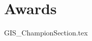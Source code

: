 \documentclass[class=book , crop=false]{standalone}
\begin{document}
\chapter{Awards}
{GIS_ChampionSection.tex}
\end{document}
